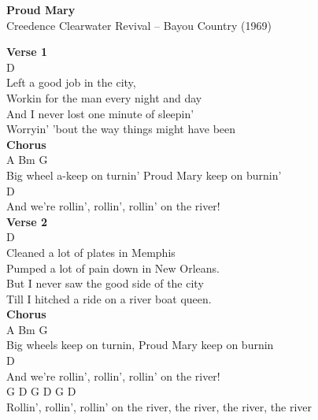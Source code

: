 \documentclass[a4paper]{article}
\begin{document}
    \begin{center}
        \textbf{Proud Mary}
        ~\\
        Creedence Clearwater Revival -- Bayou Country (1969)
    \end{center}
    {
        \scriptsize
        \textbf{Verse 1}
        ~\\
        {
            \cutive
            \obeyspaces
D
\\
Left a good job in the city,
\\
Workin for the man every night and day
\\
And I never lost one minute of sleepin'
\\
Worryin' 'bout the way things might have been
\\

        }
        \textbf{Chorus}
        ~\\
        {
            \cutive
            \obeyspaces
A                           Bm                 G
\\
Big wheel a-keep on turnin' Proud Mary keep on burnin'
\\
D
\\
And we're rollin', rollin', rollin' on the river!
\\

        }
        \textbf{Verse 2}
        ~\\
        {
            \cutive
            \obeyspaces
D
\\
Cleaned a lot of plates in Memphis
\\
Pumped a lot of pain down in New Orleans.
\\
But I never saw the good side of the city
\\
Till I hitched a ride on a river boat queen.
\\

        }
        \textbf{Chorus}
        ~\\
        {
            \cutive
            \obeyspaces
A                           Bm                 G
\\
Big wheels keep on turnin, Proud Mary keep on burnin
\\
D
\\
And we're rollin', rollin', rollin' on the river!
\\
                                            G  D       G  D       G  D
\\
Rollin', rollin', rollin' on the river, the river, the river, the river
\\

}}
\end{document}

